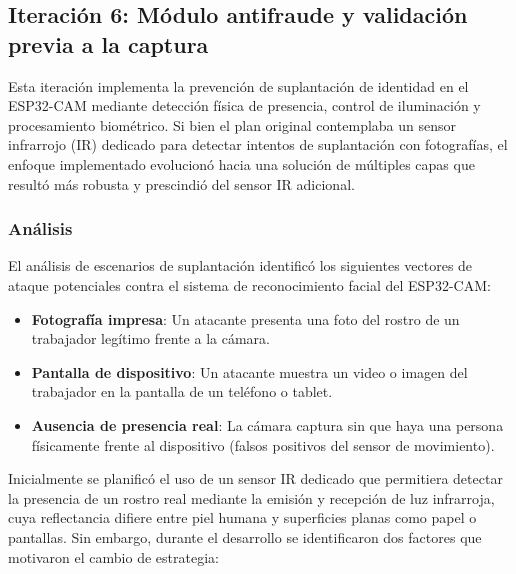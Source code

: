 
\subsection{Iteración 6: Módulo antifraude y validación previa a la captura}

Esta iteración implementa la prevención de suplantación de identidad en el ESP32-CAM mediante detección física de presencia, control de iluminación y procesamiento biométrico. Si bien el plan original contemplaba un sensor infrarrojo (IR) dedicado para detectar intentos de suplantación con fotografías, el enfoque implementado evolucionó hacia una solución de múltiples capas que resultó más robusta y prescindió del sensor IR adicional.

\subsubsection{Análisis}

El análisis de escenarios de suplantación identificó los siguientes vectores de ataque potenciales contra el sistema de reconocimiento facial del ESP32-CAM:

\begin{itemize}
    \item \textbf{Fotografía impresa}: Un atacante presenta una foto del rostro de un trabajador legítimo frente a la cámara.
    \item \textbf{Pantalla de dispositivo}: Un atacante muestra un video o imagen del trabajador en la pantalla de un teléfono o tablet.
    \item \textbf{Ausencia de presencia real}: La cámara captura sin que haya una persona físicamente frente al dispositivo (falsos positivos del sensor de movimiento).
\end{itemize}

Inicialmente se planificó el uso de un sensor IR dedicado que permitiera detectar la presencia de un rostro real mediante la emisión y recepción de luz infrarroja, cuya reflectancia difiere entre piel humana y superficies planas como papel o pantallas. Sin embargo, durante el desarrollo se identificaron dos factores que motivaron el cambio de estrategia:


